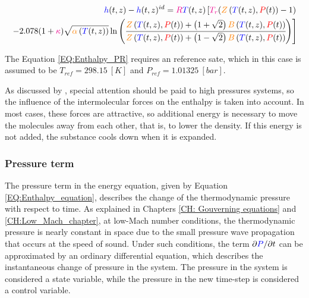 \documentclass[../Article_Model_Parameters.tex]{subfiles}
\begin{document}
			{\scriptsize
				\begin{equation}
					\begin{split}
					{\color{blue}h}(t,z)-{\color{blue}h}(t,z)^{id}={\color{magenta}R}{\color{blue}T}(t,z) \left[{\color{magenta}T_r}({\color{orange}Z}\left({\color{blue}T}(t,z), {\color{red}P}(t)\right)-1) \right. \\
					\left. -2.078(1+{\color{magenta}\kappa} ){\sqrt { {\color{orange}\alpha}\left({\color{blue}T}(t,z)\right) } } \ln \left(\cfrac{{\color{orange}Z}\left({\color{blue}T}(t,z), {\color{red}P}(t)\right)+\left( 1+\sqrt{2} \right){\color{orange}B}\left({\color{blue}T}(t,z), {\color{red}P}(t)\right)}{{\color{orange}Z}\left({\color{blue}T}(t,z), {\color{red}P}(t)\right)+\left( 1-\sqrt{2} \right){\color{orange}B}\left({\color{blue}T}(t,z), {\color{red}P}(t)\right)}\right)\right]
					\label{EQ:Enthalpy_PR}
				\end{split}
			\end{equation}				
			}
		
			The Equation \ref{EQ:Enthalpy_PR} requires an reference sate, which in this case is assumed to be $T_{ref}=298.15~[K]$ and $P_{ref}=1.01325~[bar]$.
			
			As discussed by \citet{Gmehling2019}, special attention should be paid to high pressures systems, so the influence of the intermolecular forces on the enthalpy is taken into account. In most cases, these forces are attractive, so additional energy is necessary to move the molecules away from each other, that is, to lower the density. If this energy is not added, the substance cools down when it is expanded.
			
		\subsubsection{Pressure term} \label{CH: Pressure}
		
		The pressure term in the energy equation, given by Equation \ref{EQ:Enthalpy_equation}, describes the change of the thermodynamic pressure with respect to time. As explained in Chapters \ref{CH: Gouverning equations} and \ref{CH:Low_Mach_chapter}, at low-Mach number conditions, the thermodynamic pressure is nearly constant in space due to the small pressure wave propagation that occurs at the speed of sound. Under such conditions, the term $\partial {\color{blue}P}/\partial t$ can be approximated by an ordinary differential equation, which describes the instantaneous change of pressure in the system. The pressure in the system is considered a state variable, while the pressure in the new time-step is considered a control variable.
		
\end{document}
